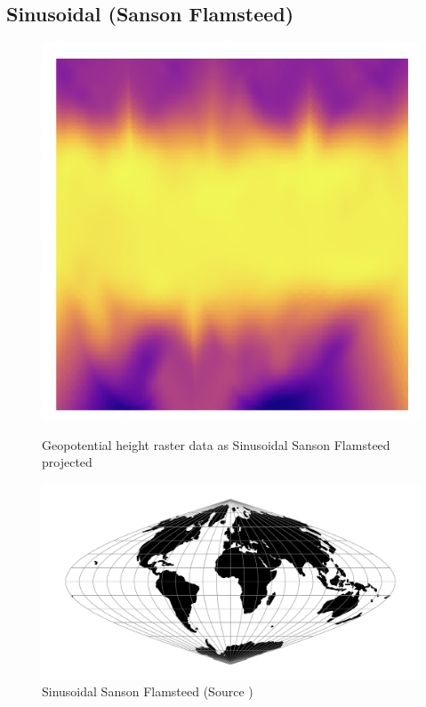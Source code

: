 \subsection{Sinusoidal (Sanson Flamsteed)}
\begin{figure}[H]
    \centering
    \begin{minipage}{0.30\textwidth}
        \centering
        \includegraphics[width=0.9\linewidth]{figures/chapter-8/geopoth_goode.png}
        \caption{ Geopotential height raster data as Sinusoidal Sanson Flamsteed projected}
        \label{fig:ig_geopoth_raster}
    \end{minipage}\hfill
    \begin{minipage}{0.30\textwidth}
        \centering
        \includegraphics[width=0.9\linewidth]{figures/chapter-8/sinu.png}
        \caption{Sinusoidal Sanson Flamsteed (Source \cite{PROJ_SITE})}

\end{minipage}
\end{figure}
